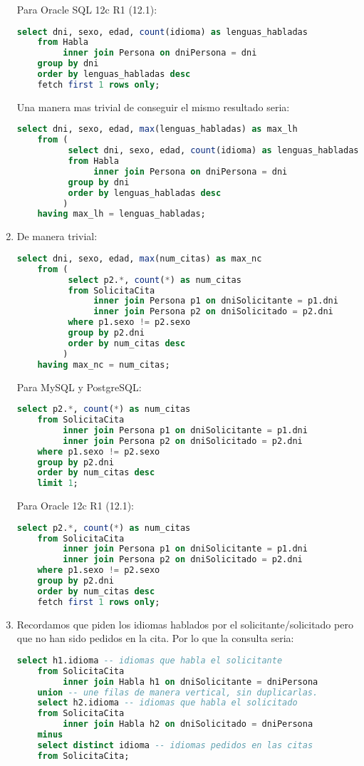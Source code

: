 \begin{enumerate}
	Para Oracle SQL 12c R1 (12.1):
	\begin{lstlisting}[language=sql]
	select dni, sexo, edad, count(idioma) as lenguas_habladas
	from Habla
		 inner join Persona on dniPersona = dni
	group by dni
	order by lenguas_habladas desc
	fetch first 1 rows only;\end{lstlisting}
	
	Una manera mas trivial de conseguir el mismo resultado seria:
	\begin{lstlisting}[language=sql]
	select dni, sexo, edad, max(lenguas_habladas) as max_lh
	from (
		  select dni, sexo, edad, count(idioma) as lenguas_habladas
		  from Habla
			   inner join Persona on dniPersona = dni
		  group by dni
		  order by lenguas_habladas desc
		 )
	having max_lh = lenguas_habladas;\end{lstlisting}	
	\newpage

	\item De manera trivial:
	\begin{lstlisting}[language=sql]
	select dni, sexo, edad, max(num_citas) as max_nc
	from (
		  select p2.*, count(*) as num_citas
		  from SolicitaCita
		  	   inner join Persona p1 on dniSolicitante = p1.dni
		  	   inner join Persona p2 on dniSolicitado = p2.dni
		  where p1.sexo != p2.sexo
		  group by p2.dni
		  order by num_citas desc
		 )
	having max_nc = num_citas;\end{lstlisting}
	
	Para MySQL y PostgreSQL:
	\begin{lstlisting}[language=sql]
	select p2.*, count(*) as num_citas
	from SolicitaCita
		 inner join Persona p1 on dniSolicitante = p1.dni
		 inner join Persona p2 on dniSolicitado = p2.dni
	where p1.sexo != p2.sexo
	group by p2.dni
	order by num_citas desc
	limit 1;\end{lstlisting}
	
	Para Oracle 12c R1 (12.1):
	\begin{lstlisting}[language=sql]
	select p2.*, count(*) as num_citas
	from SolicitaCita
	 	 inner join Persona p1 on dniSolicitante = p1.dni
		 inner join Persona p2 on dniSolicitado = p2.dni
	where p1.sexo != p2.sexo
	group by p2.dni
	order by num_citas desc
	fetch first 1 rows only;\end{lstlisting}
	\newpage
	
	\item Recordamos que piden los idiomas hablados por el solicitante/solicitado pero que no han sido pedidos en la cita. Por lo que la consulta seria:
	\begin{lstlisting}[language=sql]
	select h1.idioma -- idiomas que habla el solicitante
	from SolicitaCita
		 inner join Habla h1 on dniSolicitante = dniPersona
	union -- une filas de manera vertical, sin duplicarlas.
	select h2.idioma -- idiomas que habla el solicitado
	from SolicitaCita
		 inner join Habla h2 on dniSolicitado = dniPersona
	minus
	select distinct idioma -- idiomas pedidos en las citas
	from SolicitaCita;\end{lstlisting}
	

\end{enumerate}
